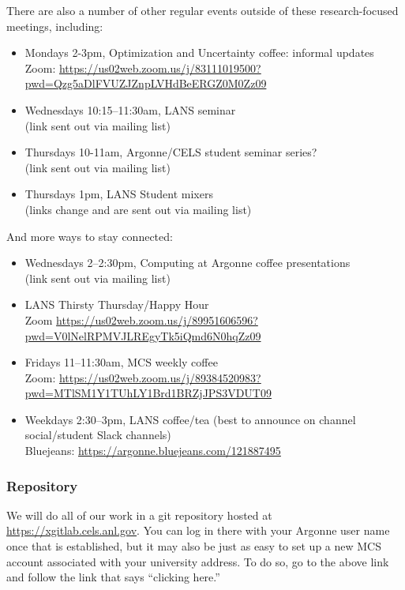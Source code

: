 \documentclass{article}
\begin{document}
There are also a number of other regular events outside of these research-focused meetings, including:
\begin{itemize}
\item Mondays 2-3pm, Optimization and Uncertainty coffee: informal updates \\
Zoom: \url{https://us02web.zoom.us/j/83111019500?pwd=Qzg5aDlFVUZJZnpLVHdBeERGZ0M0Zz09}

\item Wednesdays 10:15--11:30am, LANS seminar \\
(link sent out via mailing list)

\item Thursdays 10-11am, Argonne/CELS student seminar series? 
\\(link sent out via mailing list)

\item Thursdays 1pm, LANS Student mixers
\\(links change and are sent out via mailing list)
\end{itemize}

And more ways to stay connected:
\begin{itemize}
\item Wednesdays 2--2:30pm, Computing at Argonne coffee presentations 
\\ (link sent out via mailing list)
\item LANS Thirsty Thursday/Happy Hour
\\ Zoom \url{https://us02web.zoom.us/j/89951606596?pwd=V0lNelRPMVJLREgyTk5iQmd6N0hqZz09}
\item Fridays 11--11:30am, MCS weekly coffee\\
Zoom: \url{https://us02web.zoom.us/j/89384520983?pwd=MTlSM1Y1TUhLY1Brd1BRZjJPS3VDUT09}
\item Weekdays 2:30--3pm, LANS coffee/tea (best to announce on channel social/student Slack channels)
\\ Bluejeans: \url{https://argonne.bluejeans.com/121887495}
\end{itemize}


\subsubsection{Repository}
We will do all of our work in a git repository hosted at
\url{https://xgitlab.cels.anl.gov}. You can log in there with your Argonne user name once that is established, but it may also be just as easy to set up a new MCS account associated with your university address. To do so, go to the above link and follow the link that says ``clicking here.''
\end{document}
